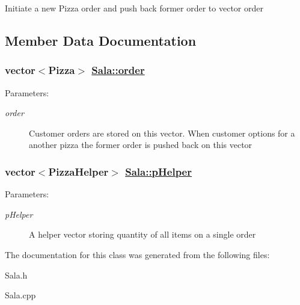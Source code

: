 Initiate a new Pizza order and push back former order to vector order 

\subsection{Member Data Documentation}
\hypertarget{class_sala_70a17ffa722a3985b86d30b034ad06d7}{
\subsubsection[order]{\setlength{\rightskip}{0pt plus 5cm}vector$<$Pizza$>$ \hyperlink{class_sala_70a17ffa722a3985b86d30b034ad06d7}{Sala::order}}}
\label{class_sala_70a17ffa722a3985b86d30b034ad06d7}


\begin{Desc}
\item[Parameters:]
\begin{description}
\item[{\em order}]Customer orders are stored on this vector. When customer options for a another pizza the former order is pushed back on this vector \end{description}
\end{Desc}
\hypertarget{class_sala_4b1abb1f80ebc80a2334733ae62acde2}{
\subsubsection[pHelper]{\setlength{\rightskip}{0pt plus 5cm}vector$<$Pizza\-Helper$>$ \hyperlink{class_sala_4b1abb1f80ebc80a2334733ae62acde2}{Sala::p\-Helper}}}
\label{class_sala_4b1abb1f80ebc80a2334733ae62acde2}


\begin{Desc}
\item[Parameters:]
\begin{description}
\item[{\em p\-Helper}]A helper vector storing quantity of all items on a single order \end{description}
\end{Desc}


The documentation for this class was generated from the following files:\begin{CompactItemize}
\item 
Sala.h\item 
Sala.cpp\end{CompactItemize}
